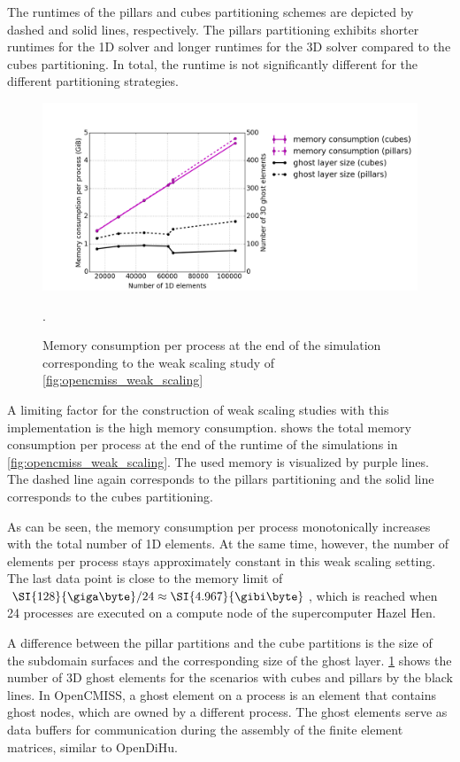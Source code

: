 The runtimes of the pillars and cubes partitioning schemes are depicted by dashed and solid lines, respectively. The pillars partitioning exhibits shorter runtimes for the 1D solver and longer runtimes for the 3D solver compared to the cubes partitioning. In total, the runtime is not significantly different for the different partitioning strategies.

\begin{figure}
  \centering%
  \includegraphics[width=\textwidth]{images/results/studies/opencmiss_memory.png}%
  \caption{Memory consumption per process at the end of the simulation corresponding to the weak scaling study of \cref{fig:opencmiss_weak_scaling}}. %
  \label{fig:opencmiss_memory}%
\end{figure}%

A limiting factor for the construction of weak scaling studies with this implementation is the high memory consumption.  shows the total memory consumption per process at the end of the runtime of the simulations in \cref{fig:opencmiss_weak_scaling}. The used memory is visualized by purple lines. The dashed line again corresponds to the pillars partitioning and the solid line corresponds to the cubes partitioning. 

As can be seen, the memory consumption per process monotonically increases with the total number of 1D elements. 
At the same time, however, the number of elements per process stays approximately constant in this weak scaling setting. The last data point is close to the memory limit of $\SI{128}{\giga\byte} / 24 \approx \SI{4.967}{\gibi\byte}$, which is reached when 24 processes are executed on a compute node of the supercomputer Hazel Hen.

A difference between the pillar partitions and the cube partitions is the size of the subdomain surfaces and the corresponding size of the ghost layer. \cref{fig:opencmiss_memory} shows the number of 3D ghost elements for the scenarios with cubes and pillars by the black lines. In OpenCMISS, a ghost element on a process is an element that contains ghost nodes, which are owned by a different process. The ghost elements serve as data buffers for communication during the assembly of the finite element matrices, similar to OpenDiHu.


